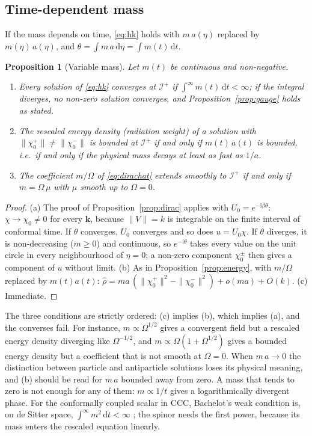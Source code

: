 \documentclass[11pt,a4paper]{article}
\newtheorem{proposition}{Proposition}
\theoremstyle{definition}
\newcommand{\scri}{\mathscr{I}^{+}}
\newcommand{\dd}{\mathrm{d}}
\newcommand{\ii}{\mathrm{i}}
\begin{document}
\subsection{Time-dependent mass}
\label{sec:varmass}

If the mass depends on time, \eqref{eq:hk} holds with $m\,a(\eta)$ replaced by $m(\eta)\,a(\eta)$, and $\theta=\int m\,a\,\dd\eta=\int m(t)\,\dd t$.

\begin{proposition}[Variable mass]
\label{prop:varmass}
Let $m(t)$ be continuous and non-negative.
\begin{enumerate}[label=(\alph*)]
\item Every solution of \eqref{eq:hk} converges at $\scri$ if $\int^{\infty}m(t)\,\dd t<\infty$; if the integral diverges, no non-zero solution converges, and Proposition~\ref{prop:gauge} holds as stated.
\item The rescaled energy density (radiation weight) of a solution with $\|\chi_{0}^{+}\|\neq\|\chi_{0}^{-}\|$ is bounded at $\scri$ if and only if $m(t)\,a(t)$ is bounded, i.e.\ if and only if the physical mass decays at least as fast as $1/a$.
\item The coefficient $m/\Omega$ of \eqref{eq:dirachat} extends smoothly to $\scri$ if and only if $m=\Omega\,\mu$ with $\mu$ smooth up to $\Omega=0$.
\end{enumerate}
\end{proposition}
\begin{proof}
(a) The proof of Proposition~\ref{prop:dirac} applies with $U_{0}=e^{-\ii\beta\theta}$: $\chi\to\chi_{0}\neq0$ for every $\mathbf{k}$, because $\|V\|=k$ is integrable on the finite interval of conformal time. If $\theta$ converges, $U_{0}$ converges and so does $u=U_{0}\chi$. If $\theta$ diverges, it is non-decreasing ($m\geq0$) and continuous, so $e^{-\ii\theta}$ takes every value on the unit circle in every neighbourhood of $\eta=0$; a non-zero component $\chi_{0}^{\pm}$ then gives a component of $u$ without limit. (b) As in Proposition~\ref{prop:energy}, with $m/\Omega$ replaced by $m(t)a(t)$: $\hat\rho=m a\,(\|\chi_{0}^{+}\|^{2}-\|\chi_{0}^{-}\|^{2})+o(m a)+O(k)$. (c) Immediate.
\end{proof}

The three conditions are strictly ordered: (c) implies (b), which implies (a), and the converses fail. For instance, $m\propto\Omega^{1/2}$ gives a convergent field but a rescaled energy density diverging like $\Omega^{-1/2}$, and $m\propto\Omega(1+\Omega^{1/2})$ gives a bounded energy density but a coefficient that is not smooth at $\Omega=0$. When $m\,a\to0$ the distinction between particle and antiparticle solutions loses its physical meaning, and (b) should be read for $m\,a$ bounded away from zero. A mass that tends to zero is not enough for any of them: $m\propto1/t$ gives a logarithmically divergent phase. For the conformally coupled scalar in CCC, Bachelot's weak condition is, on de Sitter space, $\int^{\infty}m^{2}\,\dd t<\infty$ \cite{Bachelot2020}; the spinor needs the first power, because its mass enters the rescaled equation linearly.
\end{document}
